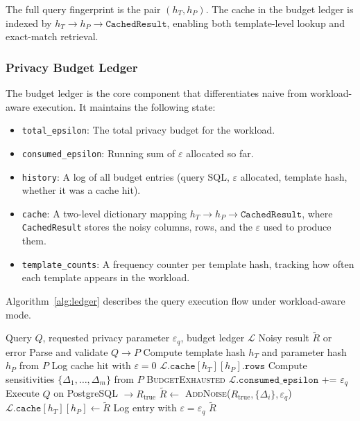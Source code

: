 \documentclass[sigconf,nonacm]{acmart}
\begin{document}
The full query fingerprint is the pair $(h_T, h_P)$. The cache in the budget ledger is indexed by $h_T \rightarrow h_P \rightarrow \texttt{CachedResult}$, enabling both template-level lookup and exact-match retrieval.

\subsubsection{Privacy Budget Ledger}

The budget ledger is the core component that differentiates naive from workload-aware execution. It maintains the following state:
\begin{itemize}
    \item \texttt{total\_epsilon}: The total privacy budget for the workload.
    \item \texttt{consumed\_epsilon}: Running sum of $\varepsilon$ allocated so far.
    \item \texttt{history}: A log of all budget entries (query SQL, $\varepsilon$ allocated, template hash, whether it was a cache hit).
    \item \texttt{cache}: A two-level dictionary mapping $h_T \rightarrow h_P \rightarrow \texttt{CachedResult}$, where \texttt{CachedResult} stores the noisy columns, rows, and the $\varepsilon$ used to produce them.
    \item \texttt{template\_counts}: A frequency counter per template hash, tracking how often each template appears in the workload.
\end{itemize}

Algorithm~\ref{alg:ledger} describes the query execution flow under workload-aware mode.

\begin{algorithm}[h]
\caption{Workload-Aware Query Execution}
\label{alg:ledger}
\begin{algorithmic}[1]
\REQUIRE Query $Q$, requested privacy parameter $\varepsilon_q$, budget ledger $\mathcal{L}$
\ENSURE Noisy result $\tilde{R}$ or error
\STATE Parse and validate $Q \rightarrow P$
\STATE Compute template hash $h_T$ and parameter hash $h_P$ from $P$
    \STATE Log cache hit with $\varepsilon = 0$
    \RETURN $\mathcal{L}.\texttt{cache}[h_T][h_P].\texttt{rows}$ 
\ENDIF
\STATE Compute sensitivities $\{\Delta_1, \ldots, \Delta_m\}$ from $P$
    \RETURN \textsc{BudgetExhausted}
\ENDIF
\STATE $\mathcal{L}.\texttt{consumed\_epsilon}$ += $\varepsilon_q$
\STATE Execute $Q$ on PostgreSQL $\rightarrow R_{\text{true}}$
\STATE $\tilde{R} \leftarrow$ \textsc{AddNoise}($R_{\text{true}}, \{\Delta_i\}, \varepsilon_q$) 
\STATE $\mathcal{L}.\texttt{cache}[h_T][h_P] \leftarrow \tilde{R}$
\STATE Log entry with $\varepsilon = \varepsilon_q$
\RETURN $\tilde{R}$
\end{algorithmic}
\end{algorithm}
\end{document}
